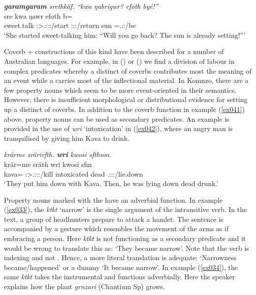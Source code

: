 \begin{exe}
	\ex \emph{\textbf{garamgaram} srethkäf. ``kwa ŋabrigwr? efoth byé!''}\\
	 sre kwa ŋawr efoth b=\\
	sweet.talk \Stsg{}:\Sbj{}>\Tsg{}.\Masc{}:\Obj{}:\Irr{}:\Pfv{}/start \Fut{} \Stsg{}:\Sbj:\Nonpast:\Ipfv/return sun \Med{}=\Tsg{}.\Masc{}:\Nonpast:\Ipfv/be\\
	\trans `She started sweet-talking him: ``Will you go back? The sun is already setting!'''
	\label{ex041}
\end{exe}

Coverb +  constructions of this kind have been described for a number of Australian languages. For example, in  (\citealt{SchultzeBerndt:2000wk}) or  (\citealt{Meakins:ul}) we find a division of labour in complex predicates whereby a distinct  of coverbs contributes most the meaning of an event while a  carries most of the inflectional material. In Komnzo, there are a few property nouns which seem to be more event-oriented in their semantics. However, there is insufficient morphological or distributional evidence for setting up a distinct  of coverbs. In addition to the coverb function in example (\ref{ex041}) above, property nouns can be used as secondary predicates. An example is provided in the use of \emph{wri} `intoxication' in (\ref{ex042}), where an angry man is tranquilised by giving him Kava to drink.

\begin{exe}
	\ex \emph{krärme srärirfth. \textbf{wri} kwosi sfthnm.}\\
	\gll krär=me sräth wri kwosi sfm\\
	kava=\Ins{} \Stpl:\Sbj>\Tsg.\Masc:\Obj:\Irr:\Pfv/kill intoxicated dead \Tsg{}.\Masc:\Sbj:\Pst:\Dur/lie.down\\
	\trans `They put him down with Kava. Then, he was lying down dead drunk.'\\
	\label{ex042}
\end{exe}

Property nouns marked with the   have an adverbial function. In example (\ref{ex033}), the  \emph{ktkt} `narrow' is the single argument of the intransitive verb. In the text, a group of headhunters prepare to attack a hamlet. The sentence is accompanied by a gesture which resembles the movement of the arms as if embracing a person. Here \emph{ktkt} is not functioning as a secondary predicate and it would be wrong to translate this as: `They became narrow'. Note that the verb is indexing \Stsg{} and not \Stnsg{}. Hence, a more literal translation is adequate: `Narrowness became/happened' or a dummy  `It became narrow'. In example (\ref{ex034}), the same  \emph{ktkt} takes the instrumental  and functions adverbially. Here the speaker explains how the plant \emph{grnzari} (Chantium Sp) grows.

